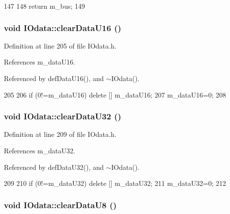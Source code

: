\begin{DoxyCode}
147                  {
148     return m_bus;
149   }
\end{DoxyCode}
\hypertarget{classIOdata_a13016f489aba6e80cd7be53224c3e8ab}{
\subsubsection[{clearDataU16}]{\setlength{\rightskip}{0pt plus 5cm}void IOdata::clearDataU16 ()}}
\label{classIOdata_a13016f489aba6e80cd7be53224c3e8ab}


Definition at line 205 of file IOdata.h.

References m\_\-dataU16.

Referenced by defDataU16(), and $\sim$IOdata().


\begin{DoxyCode}
205                      {
206     if (0!=m_dataU16) delete [] m_dataU16;
207     m_dataU16=0;
208   }
\end{DoxyCode}
\hypertarget{classIOdata_a848de1b6e7b7207dbb53c102a4d911a9}{
\subsubsection[{clearDataU32}]{\setlength{\rightskip}{0pt plus 5cm}void IOdata::clearDataU32 ()}}
\label{classIOdata_a848de1b6e7b7207dbb53c102a4d911a9}


Definition at line 209 of file IOdata.h.

References m\_\-dataU32.

Referenced by defDataU32(), and $\sim$IOdata().


\begin{DoxyCode}
209                      {
210     if (0!=m_dataU32) delete [] m_dataU32;
211     m_dataU32=0;
212   }
\end{DoxyCode}
\hypertarget{classIOdata_a9bc3ea0458ea6d13bd751ac4c80a4be6}{
\subsubsection[{clearDataU8}]{\setlength{\rightskip}{0pt plus 5cm}void IOdata::clearDataU8 ()}}
\label{classIOdata_a9bc3ea0458ea6d13bd751ac4c80a4be6}


